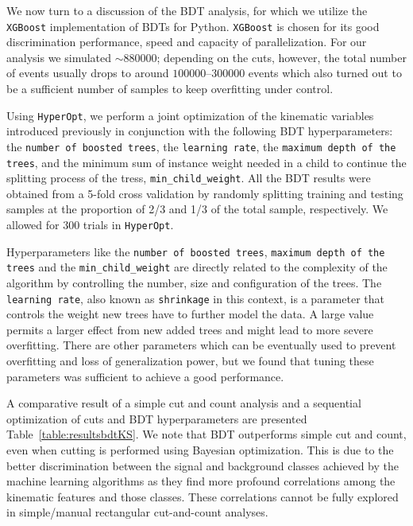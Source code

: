 
We now turn to a discussion of the BDT analysis, for which we utilize the \texttt{XGBoost}  implementation of BDTs for Python. \texttt{XGBoost} is chosen for its good discrimination performance, speed and capacity of parallelization.  For our  analysis we simulated $\sim 880000$; depending on the cuts, however, the total number of events usually drops to around $100000$--$300000$ events which also turned out to be a sufficient number of samples to keep overfitting under control.

Using \texttt{HyperOpt}, we perform a joint optimization of the kinematic variables introduced previously in conjunction with the following BDT hyperparameters: the \texttt{number of boosted trees}, the \texttt{learning rate}, the \texttt{maximum depth of the trees}, and the minimum sum of instance weight needed in a child to continue the splitting process of the tress, \texttt{min\_child\_weight}. All the BDT results were obtained from a 5-fold cross validation by randomly splitting training and testing samples at the proportion of 2/3 and 1/3 of the total sample, respectively. We allowed for 300 trials in \texttt{HyperOpt}. 

Hyperparameters like the \texttt{number of boosted trees}, \texttt{maximum depth of the trees} and the \texttt{min\_child\_weight} are directly related to the complexity of the algorithm by controlling the number, size and configuration of the trees. The \texttt{learning rate}, also known as \texttt{shrinkage} in this context, is a parameter that controls the weight new trees have to further model the data. A large value permits a larger effect from new added trees and might lead to more severe overfitting. There are other parameters which can be eventually used to prevent overfitting and loss of generalization power, but we found that tuning these parameters was sufficient to achieve a good performance.


A comparative result of a simple cut and count analysis and a sequential optimization of cuts and BDT hyperparameters are presented  Table~\ref{table:resultsbdtKS}. We note that BDT outperforms simple cut and count, even when cutting is performed using Bayesian optimization. This is due to the better discrimination between the signal and background classes achieved by the machine learning algorithms as they find more profound correlations among the kinematic features and those classes. These correlations cannot be fully explored in simple/manual rectangular cut-and-count analyses. 


